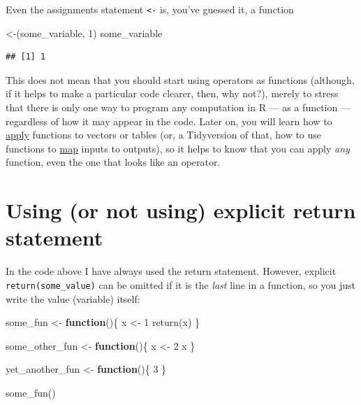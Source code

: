 \documentclass[
]{book}
\newenvironment{Shaded}{\begin{snugshade}}{\end{snugshade}}
\newcommand{\AttributeTok}[1]{\textcolor[rgb]{0.77,0.63,0.00}{#1}}
\newcommand{\ControlFlowTok}[1]{\textcolor[rgb]{0.13,0.29,0.53}{\textbf{#1}}}
\newcommand{\DecValTok}[1]{\textcolor[rgb]{0.00,0.00,0.81}{#1}}
\newcommand{\FunctionTok}[1]{\textcolor[rgb]{0.00,0.00,0.00}{#1}}
\newcommand{\NormalTok}[1]{#1}
\newcommand{\OtherTok}[1]{\textcolor[rgb]{0.56,0.35,0.01}{#1}}
\newcommand{\StringTok}[1]{\textcolor[rgb]{0.31,0.60,0.02}{#1}}
\begin{document}
Even the assignments statement \texttt{\textless{}-} is, you've guessed it, a function

\begin{Shaded}
\begin{Highlighting}[]
\StringTok{\textasciigrave{}}\AttributeTok{\textless{}{-}}\StringTok{\textasciigrave{}}\NormalTok{(some\_variable, }\DecValTok{1}\NormalTok{)}
\NormalTok{some\_variable}
\end{Highlighting}
\end{Shaded}

\begin{verbatim}
## [1] 1
\end{verbatim}

This does not mean that you should start using operators as functions (although, if it helps to make a particular code clearer, then, why not?), merely to stress that there is only one way to program any computation in R --- as a function --- regardless of how it may appear in the code. Later on, you will learn how to \href{https://stat.ethz.ch/R-manual/R-devel/library/base/html/apply.html}{apply} functions to vectors or tables (or, a Tidyversion of that, how to use functions to \href{https://purrr.tidyverse.org/}{map} inputs to outputs), so it helps to know that you can apply \emph{any} function, even the one that looks like an operator.

\hypertarget{using-or-not-using-explicit-return-statement}{%
\section{Using (or not using) explicit return statement}\label{using-or-not-using-explicit-return-statement}}

In the code above I have always used the return statement. However, explicit \texttt{return(some\_value)} can be omitted if it is the \emph{last} line in a function, so you just write the value (variable) itself:

\begin{Shaded}
\begin{Highlighting}[]
\NormalTok{some\_fun }\OtherTok{\textless{}{-}} \ControlFlowTok{function}\NormalTok{()\{}
\NormalTok{  x }\OtherTok{\textless{}{-}} \DecValTok{1}
  \FunctionTok{return}\NormalTok{(x)}
\NormalTok{\}}

\NormalTok{some\_other\_fun }\OtherTok{\textless{}{-}} \ControlFlowTok{function}\NormalTok{()\{}
\NormalTok{  x }\OtherTok{\textless{}{-}} \DecValTok{2}
\NormalTok{  x}
\NormalTok{\}}

\NormalTok{yet\_another\_fun }\OtherTok{\textless{}{-}} \ControlFlowTok{function}\NormalTok{()\{}
  \DecValTok{3}
\NormalTok{\}}

\FunctionTok{some\_fun}\NormalTok{()}
\end{Highlighting}
\end{Shaded}
\end{document}
